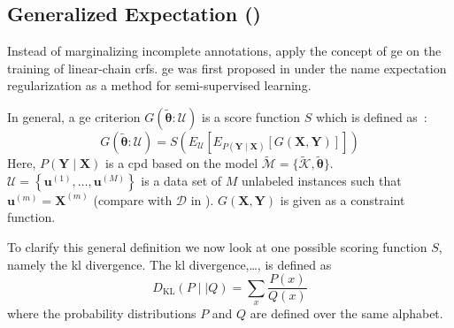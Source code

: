 \subsection{Generalized Expectation ()}

Instead of marginalizing incomplete annotations, \citet{mann2008generalized} apply the concept of \acrfull{ge} on the training of linear-chain \glspl{crf}.
\Gls{ge} was first proposed in \citet{mann2007simple} under the name \gls{expectation regularization} as a method for semi-supervised learning.


In general, a \gls{ge} criterion $G(\mathbf{\tilde{\theta}}:\mathcal{U})$ is a score function $S$ which is defined as~\citep{mann2010generalized}:
\begin{equation}
  \label{equ:generalized-expectation}
  G(\mathbf{\tilde{\theta}}:\mathcal{U})=S\left(E_{\mathcal{U}}\left[E_{P(\mathbf{Y}\mid\mathbf{X})}\left[G(\mathbf{X},\mathbf{Y})\right]\right]\right)
\end{equation}
Here, $P(\mathbf{Y}\mid\mathbf{X})$ is a \gls{cpd} based on the model $\tilde{\mathcal{M}}=\{\tilde{\mathcal{K}},\mathbf{\tilde{\theta}}\}$.
$\mathcal{U}=\left\{\mathbf{u}^{(1)},\dots,\mathbf{u}^{(M)}\right\}$ is a data set of $M$ unlabeled instances such that $\mathbf{u}^{(m)}=\mathbf{X}^{(m)}$ (compare with $\mathcal{D}$ in ).
$G(\mathbf{X},\mathbf{Y})$ is given as a constraint function.


To clarify this general definition we now look at one possible scoring function $S$, namely the \acrshort{kl} divergence.
The \acrfull{kl} divergence,\dots, is defined as~\citep{mackay2003information}
\begin{equation}
  \label{equ:kl-divergence}
  D_{\text{KL}}(P\mid\mid Q)=\sum_x \frac{P(x)}{Q(x)}
\end{equation}
where the \glspl{probability distribution} $P$ and $Q$ are defined over the same alphabet.

